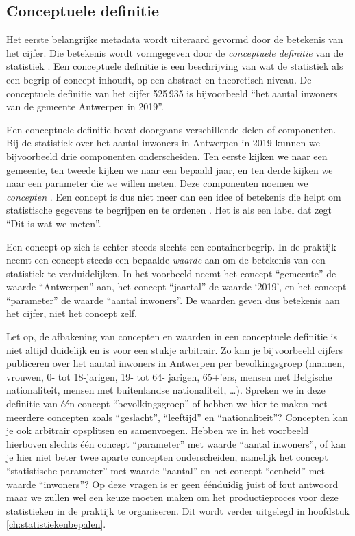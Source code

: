 \documentclass[\mainfiledir/00_handleiding_statistiekproductie.tex]{subfiles}
\begin{document}
	
	

\subsection{Conceptuele definitie}
	
Het eerste belangrijke metadata wordt uiteraard gevormd door de betekenis van het cijfer. Die betekenis wordt vormgegeven door de \emph{conceptuele definitie} van de statistiek \parencite{neuman2014Social}. Een conceptuele definitie is een beschrijving van wat de statistiek als een begrip of concept inhoudt, op een abstract en theoretisch niveau. De conceptuele definitie van het cijfer 525\,935 is bijvoorbeeld ``het aantal inwoners van de gemeente Antwerpen in 2019''. 
		
Een conceptuele definitie bevat doorgaans verschillende delen of componenten. Bij de statistiek over het aantal inwoners in Antwerpen in 2019 kunnen we bijvoorbeeld drie componenten onderscheiden. Ten eerste kijken we naar een gemeente, ten tweede kijken we naar een bepaald jaar, en ten derde kijken we naar een parameter die we willen meten. Deze componenten noemen we \emph{concepten} \parencite{clark2021Social}. Een concept is dus niet meer dan een idee of betekenis die helpt om statistische gegevens te begrijpen en te ordenen \parencite{GSIM2024}. Het is als een label dat zegt ``Dit is wat we meten''. 
	
Een concept op zich is echter steeds slechts een containerbegrip. In de praktijk neemt een concept steeds een bepaalde \emph{waarde} aan om de betekenis van een statistiek te verduidelijken. In het voorbeeld neemt  het concept ``gemeente'' de waarde ``Antwerpen'' aan, het concept ``jaartal'' de waarde `2019', en het concept ``parameter'' de waarde ``aantal inwoners''. De waarden geven dus betekenis aan het cijfer, niet het concept zelf. 
		
Let op, de afbakening van concepten en waarden in een conceptuele definitie is niet altijd duidelijk en is voor een stukje arbitrair. Zo kan je bijvoorbeeld cijfers publiceren over het aantal inwoners in Antwerpen per bevolkingsgroep (mannen, vrouwen, 0- tot 18-jarigen, 19- tot 64- jarigen, 65+'ers, mensen met Belgische nationaliteit, mensen met buitenlandse nationaliteit, \ldots). Spreken we in deze definitie van één concept ``bevolkingsgroep'' of hebben we hier te maken met meerdere concepten zoals ``geslacht'', ``leeftijd'' en ``nationaliteit''? Concepten kan je ook arbitrair opsplitsen en samenvoegen. Hebben we in het voorbeeld hierboven slechts één concept ``parameter'' met waarde ``aantal inwoners'', of kan je hier niet beter twee aparte concepten onderscheiden, namelijk het concept ``statistische parameter'' met waarde ``aantal'' en het concept ``eenheid'' met waarde ``inwoners''? Op deze vragen is er geen éénduidig juist of fout antwoord maar we zullen wel een keuze moeten maken om het productieproces voor deze statistieken in de praktijk te organiseren. Dit wordt verder uitgelegd in hoofdstuk \ref{ch:statistiekenbepalen}.
		
\end{document}
